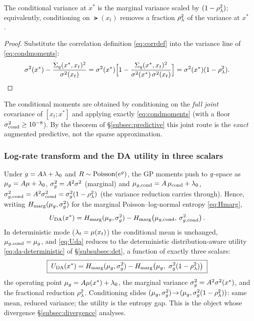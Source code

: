 \begin{proposition}\label{prop:fracvar}
The conditional variance at $x^*$ is the marginal variance scaled by
$(1-\rho_{\lambda}^2)$; equivalently, conditioning on $\lat(x_t)$ removes a fraction
$\rho_{\lambda}^2$ of the variance at $x^*$.
\end{proposition}
\begin{proof}
Substitute the correlation definition \eqref{eq:corrdef} into the variance line
of \eqref{eq:condmoments}:
\[
  \sigma^{2}(x^*)-\frac{\Sigma_q(x^*,x_t)^2}{\sigma^{2}(x_t)}
  =\sigma^{2}(x^*)\Bigl[1-\frac{\Sigma_q(x^*,x_t)^2}{\sigma^{2}(x^*)\,\sigma^{2}(x_t)}\Bigr]
  =\sigma^{2}(x^*)(1-\rho_{\lambda}^2).
\]
\end{proof}

The conditional moments are obtained by conditioning on the \emph{full joint}
covariance of $[x_t;x^*]$ and applying exactly \eqref{eq:condmoments} (with a
floor $\sigma^{2}_{\mathrm{cond}}\ge10^{-8}$). By the theorem of
\S\ref{subsec:predictive} this joint route is the \emph{exact} augmented
predictive, not the sparse approximation.

\subsubsection{Log-rate transform and the DA utility in three scalars}
Under $g=A\lambda+\lambda_{0}$ and $R\sim\mathrm{Poisson}(e^{g})$, the GP moments push to
$g$-space as $\mu_{g}=A\mu+\lambda_{0}$, $\sigma_{g}^{2}=A^2\sigma^{2}$ (marginal) and
$\mu_{g,\mathrm{cond}}=A\,\mu_{\mathrm{cond}}+\lambda_{0}$,
$\sigma^{2}_{g,\mathrm{cond}}=A^2\sigma^{2}_{\mathrm{cond}}=\sigma_{g}^{2}(1-\rho_{\lambda}^2)$
(the variance reduction carries through). Hence, writing
$H_{\mathrm{marg}}(\mu_{g},\sigma_{g}^{2})$ for the marginal Poisson--log-normal entropy \eqref{eq:Hmarg},
\[
  U_{\mathrm{DA}}(x^*)=H_{\mathrm{marg}}(\mu_{g},\sigma_{g}^{2})-H_{\mathrm{marg}}\!\left(\mu_{g,\mathrm{cond}},\,\sigma^{2}_{g,\mathrm{cond}}\right).
\]
In deterministic mode ($\lambda_t=\mu(x_t)$) the conditional mean is unchanged,
$\mu_{g,\mathrm{cond}}=\mu_{g}$, and \eqref{eq:Uda} reduces to the deterministic
distribution-aware utility \eqref{eq:da-deterministic} of \S\ref{subsubsec:det},
a function of exactly three scalars:
\begin{equation}\label{eq:daboxed}
  \boxed{\;\Uda(x^*)=\Hmarg(\mug,\varg)-\Hmarg\!\left(\mug,\ \varg(1-\corr^2)\right)\;}
\end{equation}
the operating point $\mu_{g}=A\mu(x^*)+\lambda_{0}$, the marginal variance
$\sigma_{g}^{2}=A^2\sigma^{2}(x^*)$, and the fractional reduction $\rho_{\lambda}^2$. Conditioning
slides $(\mu_{g},\sigma_{g}^{2})\!\to\!(\mu_{g},\sigma_{g}^{2}(1-\rho_{\lambda}^2))$: same mean, reduced variance;
the utility is the entropy gap. This is the object whose divergence
\S\ref{subsec:divergence} analyses.

